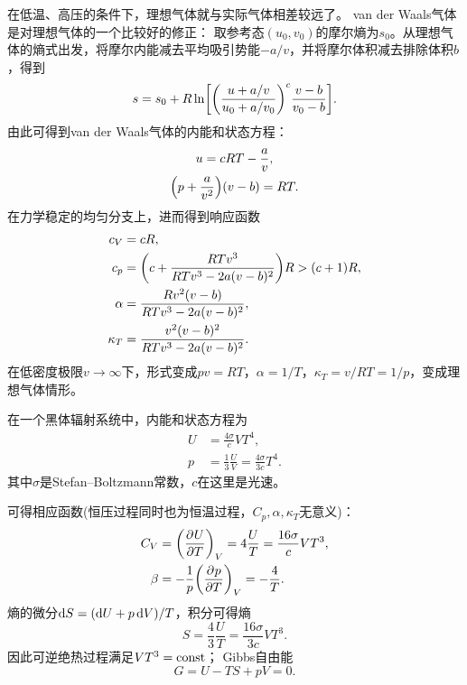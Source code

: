 在低温、高压的条件下，理想气体就与实际气体相差较远了。
van der Waals气体是对理想气体的一个比较好的修正：
取参考态$(u_0,v_0)$的摩尔熵为$s_0$。从理想气体的熵式出发，将摩尔内能减去平均吸引势能$-a/v$，并将摩尔体积减去排除体积$b$，得到
\begin{equation}
	s = s_0 + R\ln\biggl[\biggl(\frac{u + a/v}{u_0 + a/v_0}\biggr)^c\frac{v - b}{v_0 - b}\biggr] .
\end{equation}
由此可得到van der Waals气体的内能和状态方程：
\begin{subequations}
	\begin{gather}
		u = cRT - \frac av,\\
		\Bigl(p + \frac a{v^2}\Bigr)(v - b) = RT.
	\end{gather}
\end{subequations}
在力学稳定的均匀分支上，进而得到响应函数
\begin{subequations}
	\begin{align}
		c_V &= cR,\\
		c_p &= \biggl(c + \frac{RTv^3}{RTv^3 - 2a(v - b)^2}\biggr)R > (c + 1)R,\\
		\alpha &= \frac{Rv^2(v - b)}{RTv^3 - 2a(v - b)^2},\\
		\kappa_T &= \frac{v^2(v - b)^2}{RTv^3 - 2a(v - b)^2}.
	\end{align}
\end{subequations}
在低密度极限$v \to \infty$下，形式变成$pv = RT$，$\alpha = 1/T$，$\kappa_T = v/RT = 1/p$，变成理想气体情形。


在一个黑体辐射系统中，内能和状态方程为
\begin{subequations}
	\begin{align}
		U &= \frac{4\sigma}cVT^4,\\
		p &= \frac13\frac UV = \frac{4\sigma}{3c}T^4.
	\end{align}
\end{subequations}
其中$\sigma$是Stefan--Boltzmann常数，$c$在这里是光速。

可得相应函数(恒压过程同时也为恒温过程，$C_p,\alpha,\kappa_T$无意义)：
\begin{subequations}
	\begin{align}
		C_V &= \biggl(\frac{\partial^{}U}{\partial{T}^{}}\biggr)_{V} = 4\frac UT = \frac{16\sigma}cVT^3,\\
		\beta &= -\frac1p\biggl(\frac{\partial^{}p}{\partial{T}^{}}\biggr)_{V} = -\frac4T.
	\end{align}
\end{subequations}
熵的微分$\mathop{}\!\mathrm{d} S = (\mathop{}\!\mathrm{d} U + p\mathop{}\!\mathrm{d} V)/T$，积分可得熵
\begin{equation}
	S = \frac43\frac UT = \frac{16\sigma}{3c}VT^3.
\end{equation}
因此可逆绝热过程满足$VT^3 = \mathrm{const}$；
Gibbs自由能
\begin{equation}
	G = U - TS + pV = 0.
\end{equation}

